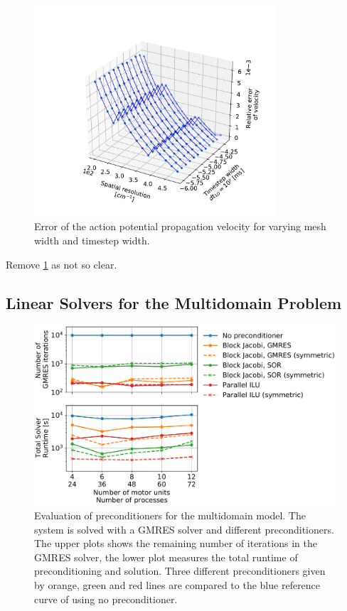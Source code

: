 \begin{figure}
  \centering%
  \includegraphics[width=0.8\textwidth]{images/results/studies/hh_cn_error_propagation_velocity_3d.pdf}%
  \caption{Error of the action potential propagation velocity for varying mesh width and timestep width.}%
   \label{fig:hh_cn_error_propagation_velocity_3d}%
\end{figure}

Remove \cref{fig:hh_cn_error_propagation_velocity_3d} as not so clear.
\subsection{Linear Solvers for the Multidomain Problem}\label{sec:multidomain_solvers}

\begin{figure}[H]
  \centering%
  \includegraphics[width=\textwidth]{images/results/studies/multidomain_solvers_selected.pdf}%
  \caption{Evaluation of preconditioners for the multidomain model. The system is solved with a GMRES solver and different preconditioners. The upper plots shows the remaining number of iterations in the GMRES solver, the lower plot measures the total runtime of preconditioning and solution. Three different preconditioners given by orange, green and red lines are compared to the blue reference curve of using no preconditioner.}%
  \label{fig:multidomain_solver}%
\end{figure}

